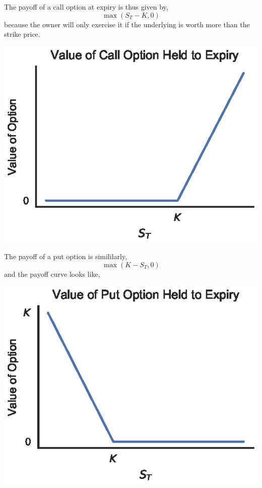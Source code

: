 \documentclass[twocolumn]{article}
\begin{document}
The payoff of a call option at expiry is thus given by,
\[ \max(S_T - K, 0) \]
because the owner will only exercise it if the underlying is worth more than the
strike price.

\begin{center}
\includegraphics{figs/calloptpayoff}
\end{center}

The payoff of a put option is simililarly,
\[ \max(K-S_T, 0) \]
and the payoff curve looks like,

\begin{center}
\includegraphics{figs/putoptpayoff}
\end{center}
\end{document}
